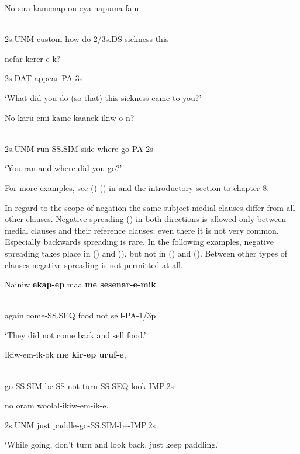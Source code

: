 \ea%
\label{ex:x1451}
\gll No  sira  kamenap  on-eya  napuma  fain \\
      \\
\glt
\z

2s.UNM  custom  how  do-2/3s.DS  sickness  this

nefar  kerer-e-k?

2s.DAT  appear-PA-3s

`What did you do (so that) this sickness came to you?'

\ea%
\label{ex:x1450}
\gll No  karu-emi  kame  kaanek  ikiw-o-n? \\
      \\
\glt
\z

2s.UNM  run-SS.SIM  side  where  go-PA-2s

`You ran and where did you go?'

For more examples, see ()-() in  and the introductory section to chapter 8. 

In regard to the scope of negation the same-subject medial clauses differ from all other clauses.  Negative spreading () in both directions is allowed only between  medial clauses and their reference clauses; even there it is not very common. Especially backwards spreading is rare. In the following examples, negative spreading takes place in () and (), but not in () and (). Between other types of clauses negative spreading is not permitted at all. 

\ea%
\label{ex:x1443}
\gll Nainiw  \textbf{ekap-ep}  maa  \textbf{me  sesenar-e-mik}. \\
      \\
\glt
\z

again  come-SS.SEQ  food  not  sell-PA-1/3p

`They did not come back and sell food.'

\ea%
\label{ex:x1447}
\gll Ikiw-em-ik-ok  \textbf{me  kir-ep  uruf-e}, \\
      \\
\glt
\z

go-SS.SIM-be-SS  not  turn-SS.SEQ  look-IMP.2s

no  oram  woolal-ikiw-em-ik-e.

2s.UNM  just  paddle-go-SS.SIM-be-IMP.2s

`While going, don't turn and look back, just keep paddling.'

